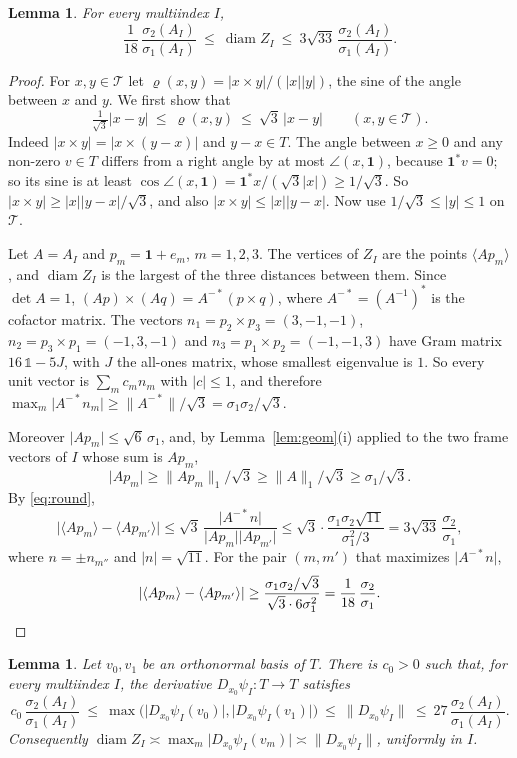 \documentclass[11pt]{amsart}
\newcommand{\id}{\mathds{1}}
\newtheorem{lemma}[proposition]{Lemma}
\theoremstyle{definition}
\theoremstyle{remark}
\newcommand{\one}{\mathbf 1}
\newcommand{\cT}{\mathcal T}
\newcommand{\abs}[1]{\lvert #1\rvert}
\newcommand{\norm}[1]{\lVert #1\rVert}
\newcommand{\pr}[1]{\langle #1\rangle}
\DeclareMathOperator{\diam}{diam}
\begin{document}
\begin{lemma}\label{lem:diamZ}
For every multiindex $I$,
\[
  \frac1{18}\,\frac{\sigma_2(A_I)}{\sigma_1(A_I)}\ \le\ \diam Z_I\ \le\
  3\sqrt{33}\,\frac{\sigma_2(A_I)}{\sigma_1(A_I)} .
\]
\end{lemma}

\begin{proof}
For $x,y\in\cT$ let $\varrho(x,y)=\abs{x\times y}/(\abs x\abs y)$, the sine of the angle
between $x$ and $y$. We first show that
\begin{equation}\label{eq:round}
  \tfrac1{\sqrt3}\abs{x-y}\ \le\ \varrho(x,y)\ \le\ \sqrt3\,\abs{x-y}\qquad(x,y\in\cT).
\end{equation}
Indeed $\abs{x\times y}=\abs{x\times(y-x)}$ and $y-x\in T$. 
The angle between $x\ge0$ and any non-zero $v\in T$ differs from a right angle by at most $\angle(x,\one)$, because $\one^*v=0$; so its sine is at least $\cos\angle(x,\one)=\one^*x/(\sqrt3\abs x)\ge1/\sqrt3$.
So $\abs{x\times y}\ge\abs x\abs{y-x}/\sqrt3$, and also $\abs{x\times y}\le\abs x\abs{y-x}$.
Now use $1/\sqrt3\le\abs y\le1$ on $\cT$.

Let $A=A_I$ and $p_m=\one+e_m$, $m=1,2,3$. The vertices of $Z_I$ are the points $\pr{Ap_m}$, and $\diam Z_I$ is the
largest of the three distances between them. Since $\det A=1$,
$(Ap)\times(Aq)=A^{-*}(p\times q)$, where $A^{-*}=(A^{-1})^*$ is the cofactor matrix. The vectors $n_1=p_2\times p_3=(3,-1,-1)$,
$n_2=p_3\times p_1=(-1,3,-1)$ and $n_3=p_1\times p_2=(-1,-1,3)$ have Gram matrix $16\,\id-5J$, with
$J$ the all-ones matrix, whose smallest eigenvalue is $1$. So every unit vector is
$\sum_m c_mn_m$ with $\abs c\le1$, and therefore
$\max_m\abs{A^{-*}n_m}\ge\norm{A^{-*}}/\sqrt3=\sigma_1\sigma_2/\sqrt3$.

Moreover $\abs{Ap_m}\le\sqrt6\,\sigma_1$, and, by
Lemma~\ref{lem:geom}(i) applied to the two frame vectors of $I$ whose sum is $Ap_m$,
\[
  \abs{Ap_m}\ge\norm{Ap_m}_1/\sqrt3\ge\norm A_1/\sqrt3\ge\sigma_1/\sqrt3.
\]
By \eqref{eq:round},
\[
  \abs{\pr{Ap_m}-\pr{Ap_{m'}}}\le\sqrt3\,\frac{\abs{A^{-*}n}}{\abs{Ap_m}\abs{Ap_{m'}}}
  \le\sqrt3\cdot\frac{\sigma_1\sigma_2\sqrt{11}}{\sigma_1^2/3}=3\sqrt{33}\,\frac{\sigma_2}{\sigma_1},
\]
where $n=\pm n_{m''}$ and $\abs n=\sqrt{11}$. For the pair $(m,m')$ that maximizes
$\abs{A^{-*}n}$,
\[
  \abs{\pr{Ap_m}-\pr{Ap_{m'}}}\ge\frac{\sigma_1\sigma_2/\sqrt3}{\sqrt3\cdot6\sigma_1^2}
  =\frac1{18}\,\frac{\sigma_2}{\sigma_1}. \qedhere
\]
\end{proof}

\begin{lemma}\label{lem:DI}
Let $v_0,v_1$ be an orthonormal basis of $T$. There is $c_0>0$ such that, for every multiindex $I$, the derivative $D_{x_0}\psi_I:T\to T$ satisfies
\[
  c_0\,\frac{\sigma_2(A_I)}{\sigma_1(A_I)}\ \le\ \max\bigl(\abs{D_{x_0}\psi_I(v_0)},\abs{D_{x_0}\psi_I(v_1)}\bigr)
  \ \le\ \norm{D_{x_0}\psi_I}\ \le\ 27\,\frac{\sigma_2(A_I)}{\sigma_1(A_I)} .
\]
Consequently $\diam Z_I\asymp\max_m\abs{D_{x_0}\psi_I(v_m)}\asymp\norm{D_{x_0}\psi_I}$, uniformly in $I$.
\end{lemma}
\end{document}
